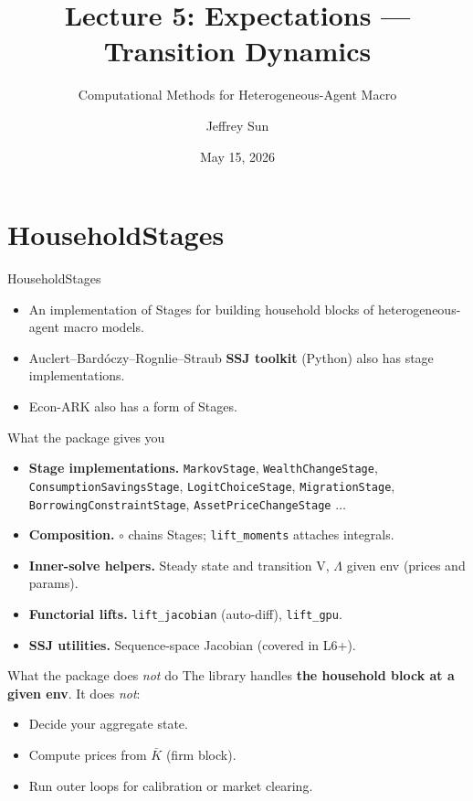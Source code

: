 \documentclass[10pt,aspectratio=169]{beamer}
\title{Lecture 5: Expectations --- Transition Dynamics}
\subtitle{Computational Methods for Heterogeneous-Agent Macro}
\author{Jeffrey Sun}
\institute{University of Toronto}
\date{May 15, 2026}
\begin{document}
\maketitle

\section[HouseholdStages]{HouseholdStages}

\begin{frame}{HouseholdStages}
  \begin{itemize}
    \item An implementation of Stages for building household blocks of heterogeneous-agent macro models.
    \item Auclert--Bardóczy--Rognlie--Straub \textbf{SSJ toolkit} (Python) also has stage implementations.
    \item Econ-ARK also has a form of Stages.
  \end{itemize}
\end{frame}

\begin{frame}{What the package gives you}
  \begin{itemize}
    \item \textbf{Stage implementations.} \texttt{MarkovStage}, \texttt{WealthChangeStage}, \texttt{ConsumptionSavingsStage}, \texttt{LogitChoiceStage}, \texttt{MigrationStage}, \texttt{BorrowingConstraintStage}, \texttt{AssetPriceChangeStage} $\dots$
    \item \textbf{Composition.} \texttt{$\circ$} chains Stages; \texttt{lift\_moments} attaches integrals.
    \item \textbf{Inner-solve helpers.} Steady state and transition V, $\Lambda$ given env (prices and params).
    \item \textbf{Functorial lifts.} \texttt{lift\_jacobian} (auto-diff), \texttt{lift\_gpu}.
    \item \textbf{SSJ utilities.} Sequence-space Jacobian (covered in L6+).
  \end{itemize}
\end{frame}

\begin{frame}{What the package does \emph{not} do}
  The library handles \textbf{the household block at a given env}. It does \emph{not}:
  \begin{itemize}
    \item Decide your aggregate state.
    \item Compute prices from $\bar K$ (firm block).
    \item Run outer loops for calibration or market clearing.
  \end{itemize}
\end{frame}
\end{document}
